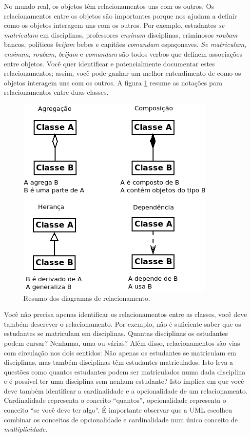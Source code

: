 \documentclass[
	11pt,				%
	openright,
	twoside,			%
	a4paper,			%
	english,			%
	french,
	brazil,				%
	sumario=tradicional
	]{abntex2}
\begin{document}
No mundo real, os objetos têm relacionamentos uns com os outros. Os relacionamentos entre os objetos são importantes porque nos ajudam a definir como os objetos interagem uns com os outros. Por exemplo, estudantes \textit{se matriculam} em disciplinas, professores \textit{ensinam} disciplinas, criminosos \textit{roubam} bancos, políticos \textit{beijam} bebes e capitães \textit{comandam} espaçonaves. \textit{Se matriculam}, \textit{ensinam}, \textit{roubam}, \textit{beijam} e \textit{comandam} são todos verbos que definem associações entre objetos. Você quer identificar e potencialmente documentar estes relacionamentos; assim, você pode ganhar um melhor entendimento de como os objetos interagem uns com os outros. A figura \ref{fig:relac} resume as notações para relacionamentos entre duas classes.

\begin{figure}[h]
\begin{center}
\includegraphics[scale=0.65]{clsRelac.png}
\end{center}
\caption{Resumo dos diagramas de relacionamento.} \label{fig:relac}
\end{figure}

Você não precisa apenas identificar os relacionamentos entre as classes, você deve também descrever o relacionamento. Por exemplo, não é suficiente saber que os estudantes se matriculam em disciplinas. Quantas disciplinas os estudantes podem cursar? Nenhuma, uma ou várias? Além disso, relacionamentos são vias com circulação nos dois sentidos: Não apenas os estudantes se matriculam em disciplinas, mas também disciplinas têm estudantes matriculados. Isto leva a questões como quantos estudantes podem ser matriculados numa dada disciplina e é possível ter uma disciplina sem nenhum estudante? Isto implica em que você deve também identificar a cardinalidade e a opcionalidade de um relacionamento. Cardinalidade representa o conceito ``quantos'', opcionalidade representa o conceito ``se você deve ter algo''. É importante observar que a UML escolheu combinar os conceitos de opcionalidade e cardinalidade num único conceito de \emph{multiplicidade}.
\end{document}
